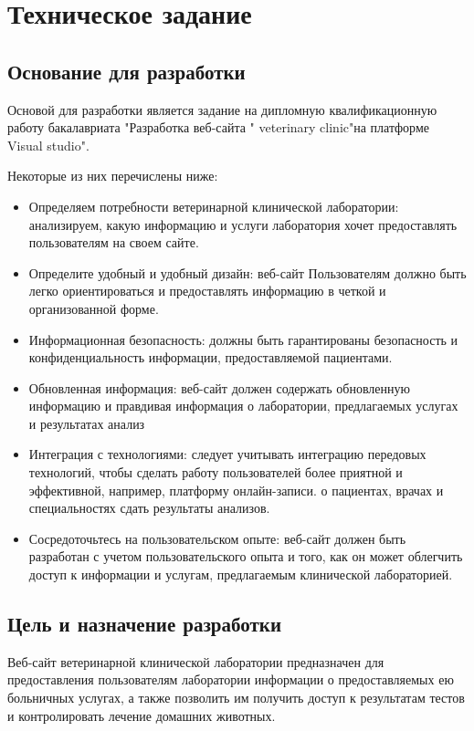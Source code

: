 \newsection
\section{Техническое задание}
\subsection{Основание для разработки}

Основой для разработки является задание на дипломную квалификационную работу бакалавриата "Разработка веб-сайта " veterinary clinic"на платформе Visual studio".

Некоторые из них перечислены ниже:

\begin{itemize}
 \item Определяем потребности ветеринарной клинической лаборатории: анализируем, какую информацию и услуги лаборатория хочет предоставлять пользователям на своем сайте.
\item Определите удобный и удобный дизайн: веб-сайт
Пользователям должно быть легко ориентироваться и предоставлять информацию в четкой и организованной форме.
\item Информационная безопасность: должны быть гарантированы безопасность и конфиденциальность информации, предоставляемой пациентами.
\item Обновленная информация: веб-сайт должен содержать обновленную информацию и
правдивая информация о лаборатории, предлагаемых услугах и результатах
анализ
\item  Интеграция с технологиями: следует учитывать интеграцию передовых технологий, чтобы сделать работу пользователей более приятной и эффективной, например, платформу онлайн-записи.
о пациентах, врачах и специальностях сдать результаты анализов.
\item  Сосредоточьтесь на пользовательском опыте: веб-сайт должен быть разработан
с учетом пользовательского опыта и того, как он может облегчить доступ к информации и услугам, предлагаемым клинической лабораторией.
\end{itemize}

\subsection{Цель и назначение разработки}

Веб-сайт ветеринарной клинической лаборатории предназначен для предоставления пользователям лаборатории информации о предоставляемых ею больничных услугах, а также
позволить им получить доступ к результатам тестов и контролировать лечение домашних животных.

